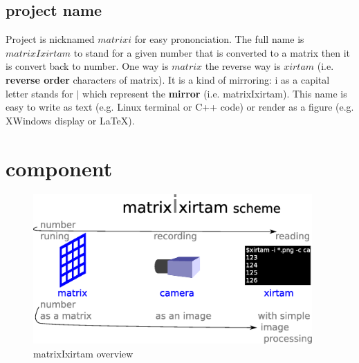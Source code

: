 \documentclass[10pt,a4paper]{report}
\begin{document}
\subsection{project name}
Project is nicknamed $matrixi$ for easy prononciation.
The full name is $matrixIxirtam$ 
to stand for a given number
that is converted to a matrix
then it is convert back to number.
One way is $matrix$ the reverse way is $xirtam$ (i.e. \textbf{reverse order} characters of matrix).
It is a kind of mirroring:
i as a capital letter stands for $\mid$ which represent the \textbf{mirror} (i.e. matrixIxirtam).
This name is easy to write as text (e.g. Linux terminal or C++ code) or render as a figure (e.g. XWindows display or LaTeX).

\section{component}
\begin{figure}
  \includegraphics[width=0.95\textwidth]{figure/matrixIxirtam.eps}
  \caption{matrixIxirtam overview}
  \label{fig:matrixIxirtam_scheme}
\end{figure}
\end{document}
